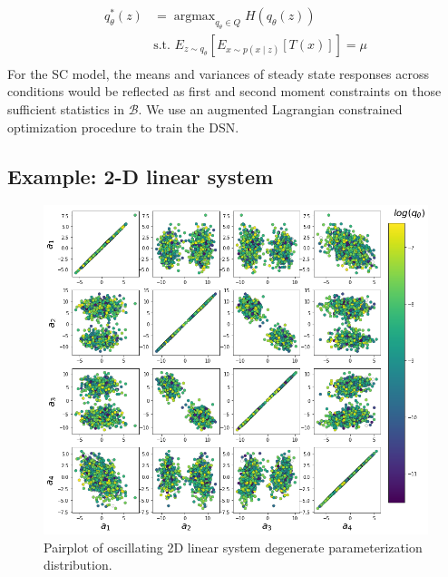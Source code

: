 \documentclass[11pt]{article}
\DeclareMathOperator*{\argmax}{argmax}
\begin{document}
\begin{equation}
\begin{split}
q_\theta^*(z) &= \argmax_{q_\theta \in Q} H(q_\theta(z)) \\
 &  \text{s.t.  } E_{z \sim q_\theta}\left[ E_{x\sim p(x \mid z)}\left[T(x)\right] \right] = \mu \\
 \end{split}
\end{equation}
For the SC model, the means and variances of steady state responses across conditions would be reflected as first and second moment constraints on those sufficient statistics in $\mathcal{B}$.  We use an augmented Lagrangian \cite{bertsekas2014constrained} constrained optimization procedure to train the DSN.

\subsection{Example: 2-D linear system}
\begin{figure}
\vspace{-.8cm}
 \caption{\label{fig:fig2} Pairplot of oscillating 2D linear system degenerate parameterization distribution.}
  \begin{center}  
\includegraphics[scale=.3]{figs/Fig2.png} 
\end{center}
\vspace{-2cm}
\end{figure}
\end{document}
